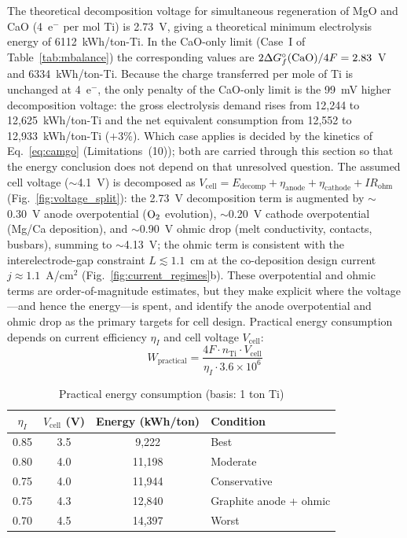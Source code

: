\documentclass[11pt]{article}
\begin{document}
The theoretical decomposition voltage for simultaneous regeneration of MgO and CaO (4~e$^-$ per mol Ti) is 2.73~V, giving a theoretical minimum electrolysis energy of 6112~kWh/ton-Ti. In the CaO-only limit (Case~I of Table~\ref{tab:mbalance}) the corresponding values are $2\Delta G^{\circ}_{f}(\ce{CaO})/4F = 2.83$~V and 6334~kWh/ton-Ti. Because the charge transferred per mole of Ti is unchanged at 4~e$^-$, the only penalty of the CaO-only limit is the 99~mV higher decomposition voltage: the gross electrolysis demand rises from 12{,}244 to 12{,}625~kWh/ton-Ti and the net equivalent consumption from 12{,}552 to 12{,}933~kWh/ton-Ti ($+$3\%). Which case applies is decided by the kinetics of Eq.~\ref{eq:camgo} (Limitations~(10)); both are carried through this section so that the energy conclusion does not depend on that unresolved question. The assumed cell voltage ($\sim$4.1~V) is decomposed as $V_{\mathrm{cell}} = E_{\mathrm{decomp}} + \eta_{\mathrm{anode}} + \eta_{\mathrm{cathode}} + IR_{\mathrm{ohm}}$ (Fig.~\ref{fig:voltage_split}): the 2.73~V decomposition term is augmented by $\sim$0.30~V anode overpotential ($\ce{O2}$ evolution), $\sim$0.20~V cathode overpotential (Mg/Ca deposition), and $\sim$0.90~V ohmic drop (melt conductivity, contacts, busbars), summing to $\sim$4.13~V; the ohmic term is consistent with the interelectrode-gap constraint $L \lesssim 1.1$~cm at the co-deposition design current $j \approx 1.1$~A/cm$^2$ (Fig.~\ref{fig:current_regimes}b). These overpotential and ohmic terms are order-of-magnitude estimates, but they make explicit where the voltage---and hence the energy---is spent, and identify the anode overpotential and ohmic drop as the primary targets for cell design. Practical energy consumption depends on current efficiency $\eta_I$ and cell voltage $V_{\mathrm{cell}}$:
\begin{equation}
W_{\mathrm{practical}} = \frac{4F \cdot n_{\mathrm{Ti}} \cdot V_{\mathrm{cell}}}{\eta_I \cdot 3.6\times10^{6}}
\end{equation}

\begin{table}[!ht]
\centering
\footnotesize
\caption{Practical energy consumption (basis: 1 ton Ti)}
\label{tab:energy}
\begin{tabular}{cccl}
\toprule
$\eta_I$ & $V_{\mathrm{cell}}$ (V) & Energy (kWh/ton) & Condition \\
\midrule
0.85 & 3.5 & 9{,}222 & Best \\
0.80 & 4.0 & 11{,}198 & Moderate \\
0.75 & 4.0 & 11{,}944 & Conservative \\
0.75 & 4.3 & 12{,}840 & Graphite anode + ohmic \\
0.70 & 4.5 & 14{,}397 & Worst \\
\bottomrule
\end{tabular}
\end{table}
\end{document}
